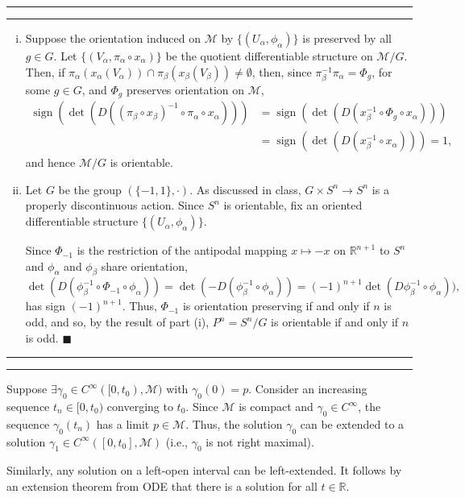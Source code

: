 \documentclass[11pt]{article}
\newcounter{questionCounter}
\newcounter{partCounter}[questionCounter]
\newenvironment{question}[2][\arabic{questionCounter}]{%
    \setcounter{partCounter}{0}%
    \vspace{.25in} \hrule \vspace{0.5em}%
        \noindent{\bf #2}%
    \vspace{0.8em} \hrule \vspace{.10in}%
    \addtocounter{questionCounter}{1}%
}{}
\renewcommand{\qed}{\quad \ensuremath{\blacksquare}}    %
\newcommand{\inv}{^{-1}}                %
\renewcommand{\det}{\operatorname{det}} %
\newcommand{\sgn}{\operatorname{sign}}  %
\newcommand{\R}{\mathbb{R}}             %
\newcommand{\M}{\mathcal{M}}            %
\begin{document}
\begin{question}{Problem 7}
\begin{enumerate}[(i)]
\item Suppose the orientation induced on $\M$ by $\{(U_\alpha,\phi_\alpha)\}$
is preserved by all $g \in G$. Let $\{(V_\alpha,\pi_\alpha \circ x_\alpha)\}$
be the quotient differentiable structure on $\M/G$. Then, if
$\pi_\alpha(x_\alpha(V_\alpha)) \cap \pi_\beta(x_\beta(V_\beta))
\neq \emptyset$, then, since $\pi_\beta\inv\pi_\alpha = \Phi_g$, for some
$g \in G$, and $\Phi_g$ preserves orientation on $\M$,
\begin{align*}
\sgn(\det(D((\pi_\beta \circ x_\beta)\inv \circ \pi_\alpha \circ x_\alpha)))
 & = \sgn(\det(D(x_\beta\inv \circ \Phi_g \circ x_\alpha)))   \\
 & = \sgn(\det(D(x_\beta\inv \circ x_\alpha))) = 1,
\end{align*}
and hence $\M/G$ is orientable.

\item Let $G$ be the group $(\{-1,1\},\cdot)$. As discussed in class,
$G \times S^n \to S^n$ is a properly discontinuous action. Since $S^n$ is
orientable, fix an oriented differentiable structure
$\{(U_\alpha,\phi_\alpha)\}$.

Since $\Phi_{-1}$ is the restriction of the antipodal mapping $x \mapsto -x$ on
$\R^{n + 1}$ to $S^n$ and $\phi_\alpha$ and $\phi_\beta$ share orientation,
\[\det(D(\phi_\beta\inv \circ \Phi_{-1} \circ \phi_\alpha))
    = \det(-D (\phi_\beta\inv \circ \phi_\alpha))
    = (-1)^{n + 1} \det(D \phi_\beta\inv \circ \phi_\alpha)),
\]
has sign $(-1)^{n + 1}$. Thus, $\Phi_{-1}$ is orientation preserving if and
only if $n$ is odd, and so, by the result of part (i), $P^n = S^n/G$ is
orientable if and only if $n$ is odd. \qed
\end{enumerate}
\end{question}

\begin{question}{Problem 8}
Suppose $\exists \gamma_0 \in C^\infty([0,t_0),\M)$ with $\gamma_0(0) = p$.
Consider an increasing sequence $t_n \in [0,t_0)$ converging to $t_0$. Since
$\M$ is compact and $\gamma_0 \in C^\infty$, the sequence $\gamma_0(t_n)$ has a
limit $p \in \M$. Thus, the solution $\gamma_0$ can be extended to a solution
$\gamma_1 \in C^\infty([0,t_0],\M)$ (i.e., $\gamma_0$ is not right maximal).

Similarly, any solution on a left-open interval can be left-extended. It
follows by an extension theorem from ODE that there is a solution for all
$t \in \R$.
\end{question}
\end{document}
